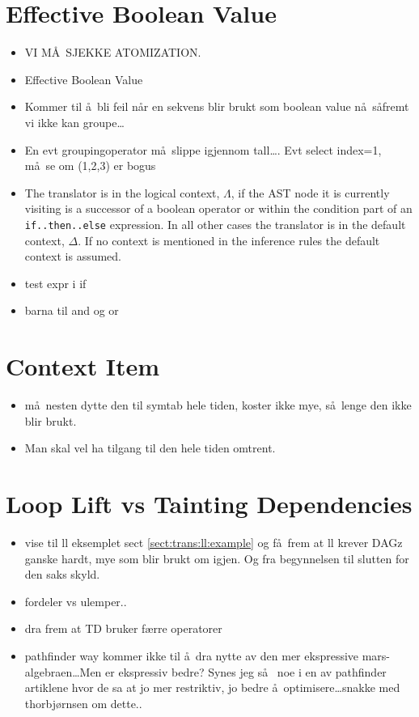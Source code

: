 \section{Effective Boolean Value}
\begin{itemize}
\item VI M\AA~SJEKKE ATOMIZATION.
\item Effective Boolean Value
\item Kommer til \aa~bli feil n\aa r en sekvens blir brukt som boolean value n\aa~s\aa fremt vi ikke kan groupe\ldots
\item En evt groupingoperator m\aa~slippe igjennom tall\ldots. Evt select index=1, m\aa~se om (1,2,3) er bogus
\item The translator is in the logical context, $\Lambda$, if the AST node it is currently visiting is a successor
of a boolean operator or within the condition part of an \texttt{if..then..else} expression. In all other cases the
translator is in the default context, $\Delta$. If no context is mentioned in the inference rules the default
context is assumed. 
\item test expr i if
\item barna til and og or
\end{itemize}

\section{Context Item}
\begin{itemize}
  \item m\aa~nesten dytte den til symtab hele tiden, koster ikke mye, s\aa~lenge den ikke blir brukt.
  \item Man skal vel ha tilgang til den hele tiden omtrent.
\end{itemize}


\section{Loop Lift vs Tainting Dependencies}
\label{sect:disc:llvsmXr}
\begin{itemize}
  \item vise til ll eksemplet sect \ref{sect:trans:ll:example} og f\aa~frem at ll krever DAGz ganske hardt,
  mye som blir brukt om igjen. Og fra begynnelsen til slutten for den saks skyld.
  \item fordeler vs ulemper..
  \item dra frem at TD bruker f\ae rre operatorer
  \item pathfinder way kommer ikke til \aa~dra nytte av den mer ekspressive mars-algebraen\ldots Men er ekspressiv
	  bedre? Synes jeg s\aa~ noe i en av pathfinder artiklene hvor de sa at jo mer restriktiv, jo bedre
	  \aa~optimisere\ldots snakke med thorbj\o rnsen om dette..
\end{itemize}


